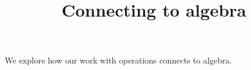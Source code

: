 \documentclass{ximera}
\title{Connecting to algebra}
\begin{document}
\begin{abstract}
\end{abstract}
\maketitle

We explore how our work with operations connects to algebra.
\end{document}
